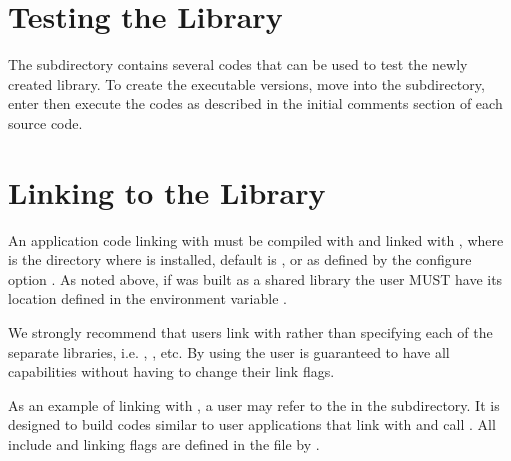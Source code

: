 
\section{Testing the Library} 

The  subdirectory contains several codes that can be used to test
the newly created \hypre{} library.  To create the executable versions, move into
the  subdirectory, enter  then execute the codes as described
in the initial comments section of each source code.


\section{Linking to the Library}

An application code linking with \hypre{} must be compiled with  
and linked with , where  is the directory 
where \hypre{} is installed, default is , or as defined by the configure 
option . As noted above, if \hypre{} was built as a shared library 
the user MUST have its location defined in the environment variable .

We strongly recommend that users link with  rather than specifying each 
of the separate \hypre{} libraries, i.e.  , ,
etc.  By using  the user is guaranteed to have all capabilities without
having to change their link flags.

As an example of linking with \hypre{}, a user may refer to the  in the 
 subdirectory.  It is designed to build codes similar to user applications
that link with and call \hypre{}.  All include and linking flags are defined in the 
 file by .


